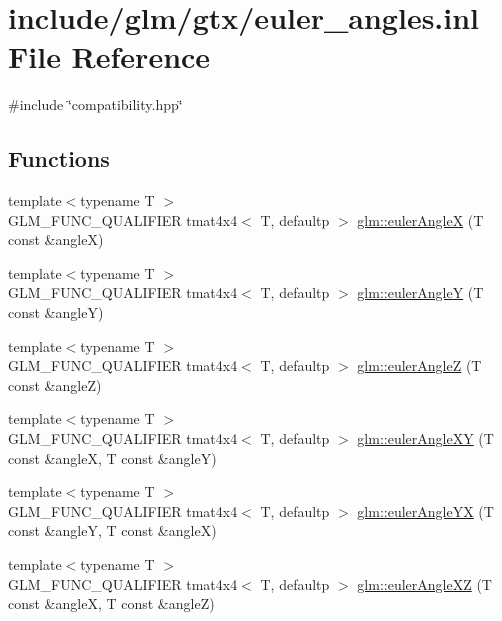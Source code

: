 \hypertarget{euler__angles_8inl}{}\section{include/glm/gtx/euler\+\_\+angles.inl File Reference}
\label{euler__angles_8inl}
{\ttfamily \#include \char`\"{}compatibility.\+hpp\char`\"{}}\newline
\subsection*{Functions}
\begin{DoxyCompactItemize}
\item 
{\footnotesize template$<$typename T $>$ }\\G\+L\+M\+\_\+\+F\+U\+N\+C\+\_\+\+Q\+U\+A\+L\+I\+F\+I\+ER tmat4x4$<$ T, defaultp $>$ \hyperlink{group__gtx__euler__angles_ga82cd3b8a04943f1a0d1a562aff358dc8}{glm\+::euler\+AngleX} (T const \&angleX)
\item 
{\footnotesize template$<$typename T $>$ }\\G\+L\+M\+\_\+\+F\+U\+N\+C\+\_\+\+Q\+U\+A\+L\+I\+F\+I\+ER tmat4x4$<$ T, defaultp $>$ \hyperlink{group__gtx__euler__angles_gaeb193af1184bdf39c23636d756e1ff33}{glm\+::euler\+AngleY} (T const \&angleY)
\item 
{\footnotesize template$<$typename T $>$ }\\G\+L\+M\+\_\+\+F\+U\+N\+C\+\_\+\+Q\+U\+A\+L\+I\+F\+I\+ER tmat4x4$<$ T, defaultp $>$ \hyperlink{group__gtx__euler__angles_gab59c4fe7f735568255cc19fddd3ddfcd}{glm\+::euler\+AngleZ} (T const \&angleZ)
\item 
{\footnotesize template$<$typename T $>$ }\\G\+L\+M\+\_\+\+F\+U\+N\+C\+\_\+\+Q\+U\+A\+L\+I\+F\+I\+ER tmat4x4$<$ T, defaultp $>$ \hyperlink{group__gtx__euler__angles_ga8bf84f92ca976a7f50dbe4b30ceb72dd}{glm\+::euler\+Angle\+XY} (T const \&angleX, T const \&angleY)
\item 
{\footnotesize template$<$typename T $>$ }\\G\+L\+M\+\_\+\+F\+U\+N\+C\+\_\+\+Q\+U\+A\+L\+I\+F\+I\+ER tmat4x4$<$ T, defaultp $>$ \hyperlink{group__gtx__euler__angles_gafdd02f9a37511190962119adef5c1c25}{glm\+::euler\+Angle\+YX} (T const \&angleY, T const \&angleX)
\item 
{\footnotesize template$<$typename T $>$ }\\G\+L\+M\+\_\+\+F\+U\+N\+C\+\_\+\+Q\+U\+A\+L\+I\+F\+I\+ER tmat4x4$<$ T, defaultp $>$ \hyperlink{group__gtx__euler__angles_gab2d7dc94b9a7519d741aaa208c7a335b}{glm\+::euler\+Angle\+XZ} (T const \&angleX, T const \&angleZ)

\end{DoxyCompactItemize}
